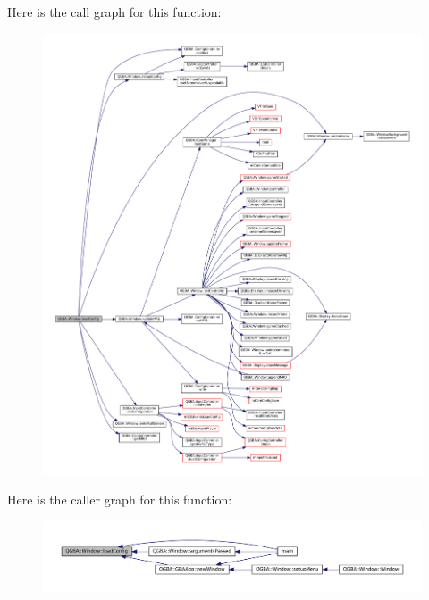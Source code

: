 Here is the call graph for this function\+:
\nopagebreak
\begin{figure}[H]
\begin{center}
\leavevmode
\includegraphics[width=350pt]{class_q_g_b_a_1_1_window_aef5de858c5948796e6e46699c1d2f45e_cgraph}
\end{center}
\end{figure}
Here is the caller graph for this function\+:
\nopagebreak
\begin{figure}[H]
\begin{center}
\leavevmode
\includegraphics[width=350pt]{class_q_g_b_a_1_1_window_aef5de858c5948796e6e46699c1d2f45e_icgraph}
\end{center}
\end{figure}
\mbox{\label{class_q_g_b_a_1_1_window_a98f5456e4ef7083a5719f929b1520b4e}} 
